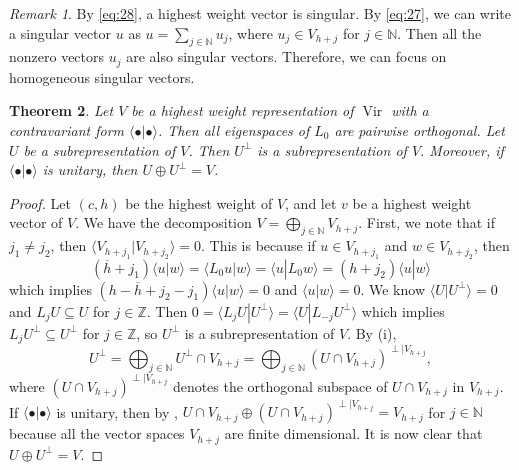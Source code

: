 \documentclass[a4paper, 12pt, reqno]{amsart}
\newtheorem{theorem}{Theorem}[section]
\theoremstyle{remark}
\newtheorem{remark}[theorem]{Remark}
\numberwithin{equation}{subsection}
\DeclareMathOperator{\Vir}{Vir}
\begin{document}
\begin{remark}
  \label{rmk:26}
  By \eqref{eq:28}, a highest weight vector is singular.
  By \eqref{eq:27}, we can write a singular vector $u$ as $u = \sum_{j \in \mathbb{N}}u_j$, where $u_j \in V_{h + j}$ for $j \in \mathbb{N}$.
  Then all the nonzero vectors $u_j$ are also singular vectors.
  Therefore, we can focus on homogeneous singular vectors.
\end{remark}

\begin{theorem}
  \label{thr:28}
  Let $V$ be a highest weight representation of $\Vir$ with a contravariant form $\langle\bullet| \bullet\rangle$.
  Then all eigenspaces of $L_0$ are pairwise orthogonal.
  Let $U$ be a subrepresentation of $V$.
  Then $U^{\perp}$ is a subrepresentation of $V$.
  Moreover, if $\langle\bullet| \bullet\rangle$ is unitary, then $U \oplus U^{\perp} = V$.
\end{theorem}

\begin{proof}
  Let $(c, h)$ be the highest weight of $V$, and let $v$ be a highest weight vector of $V$.
  We have the decomposition $V = \bigoplus_{j \in \mathbb{N}}V_{h + j}$.
  First, we note that if $j_1 \neq j_2$, then $\langle V_{h + j_1}| V_{h + j_2}\rangle = 0$.
  This is because if $u \in V_{h + j_1}$ and $w \in V_{h + j_2}$, then
  \begin{equation*}
    (\overline{h} + j_1)\langle u| w\rangle = \langle L_0u| w\rangle = \langle u| L_0w\rangle = (h + j_2)\langle u| w\rangle
  \end{equation*}
  which implies $(h - \overline{h} + j_2 - j_1)\langle u| w\rangle = 0$ and $\langle u| w\rangle = 0$.
  We know $\langle U| U^{\perp}\rangle = 0$ and $L_jU \subseteq U$ for $j \in \mathbb{Z}$.
  Then $0 = \langle L_jU| U^{\perp}\rangle = \langle U| L_{-j}U^{\perp}\rangle$ which implies $L_jU^{\perp} \subseteq U^{\perp}$ for $j \in \mathbb{Z}$, so $U^{\perp}$ is a subrepresentation of $V$.
  By (i),
  \begin{equation*}
     U^{\perp} = \bigoplus_{j \in \mathbb{N}}U^{\perp} \cap V_{h + j} = \bigoplus_{j \in \mathbb{N}}(U \cap V_{h + j})^{\perp|V_{h + j}},
  \end{equation*}
  where $(U \cap V_{h + j})^{\perp|V_{h + j}}$ denotes the orthogonal subspace of $U \cap V_{h + j}$ in $V_{h + j}$.
  If $\langle\bullet| \bullet\rangle$ is unitary, then by , $U \cap V_{h + j} \oplus (U \cap V_{h + j})^{\perp|V_{h + j}} = V_{h + j}$ for $j \in \mathbb{N}$ because all the vector spaces $V_{h + j}$ are finite dimensional.
  It is now clear that $U \oplus U^{\perp} = V$.
\end{proof}
\end{document}
